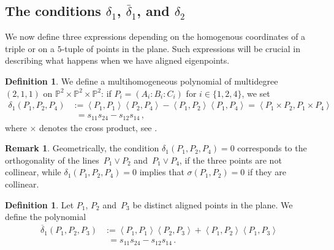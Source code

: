 \documentclass[a4paper, 11pt, reqno]{amsart}
\theoremstyle{plain}
\theoremstyle{definition}
\newtheorem{definition}[lemma]{Definition}
\newtheorem{rmk}[lemma]{Remark}
\newcommand{\p}{\mathbb{P}}
\newcommand{\scl}[2]{\left\langle {#1}, {#2} \right\rangle}
\begin{document}

\subsection{The conditions \texorpdfstring{$\delta_1$}{delta1}, \texorpdfstring{$\bar{\delta}_1$}{deltabar1}, and \texorpdfstring{$\delta_2$}{delta2}}

We now define three expressions depending on the homogenous coordinates of a triple or on a $5$-tuple of points in the plane.
Such expressions will be crucial in describing what happens when we have aligned eigenpoints.

\begin{definition}
\label{definition:delta1}
We define a multihomogeneous polynomial of multidegree~$(2,1,1)$ on $\p^2 \times \p^2 \times \p^2$:
if $P_i = (A_i: B_i: C_i)$ for $i \in \{1, 2, 4\}$, we set
%
\begin{align*}
  \delta_1(P_1, P_2, P_4) &:=
  \scl{P_1}{P_1} \scl{P_2}{P_4} - \scl{P_1}{P_2}\scl{P_1}{P_4} =
  \scl{P_1\times P_2}{P_1 \times P_4} \\
  &\phantom{:}= s_{11} s_{24}-s_{12}s_{14} \,,
\end{align*}
%
where $\times$ denotes the cross product, see .
\end{definition}

\begin{rmk}
\label{rmk:delta1_meaning}
Geometrically, the condition $\delta_1(P_1, P_2, P_4) = 0$ corresponds to the orthogonality of the lines~$P_1 \vee P_2$ and~$P_1 \vee P_4$, if the three points are not collinear, while
$\delta_1(P_1, P_2, P_4) = 0$ implies that $\sigma (P_1,P_2)=0$ if they are collinear.
\end{rmk}

\begin{definition}
\label{definition:delta1b}
Let $P_1$, $P_2$ and~$P_3$ be distinct aligned points in the plane.
We define the polynomial
%
\begin{align*}
  \overline{\delta}_1(P_1, P_2, P_3) &:=
  \scl{P_1}{P_1} \scl{P_2}{P_3} + \scl{P_1}{P_2}\scl{P_1}{P_3} \\
  &\phantom{:}= s_{11} s_{24}-s_{12}s_{14}\,.
\end{align*}
%
\end{definition}
\end{document}
